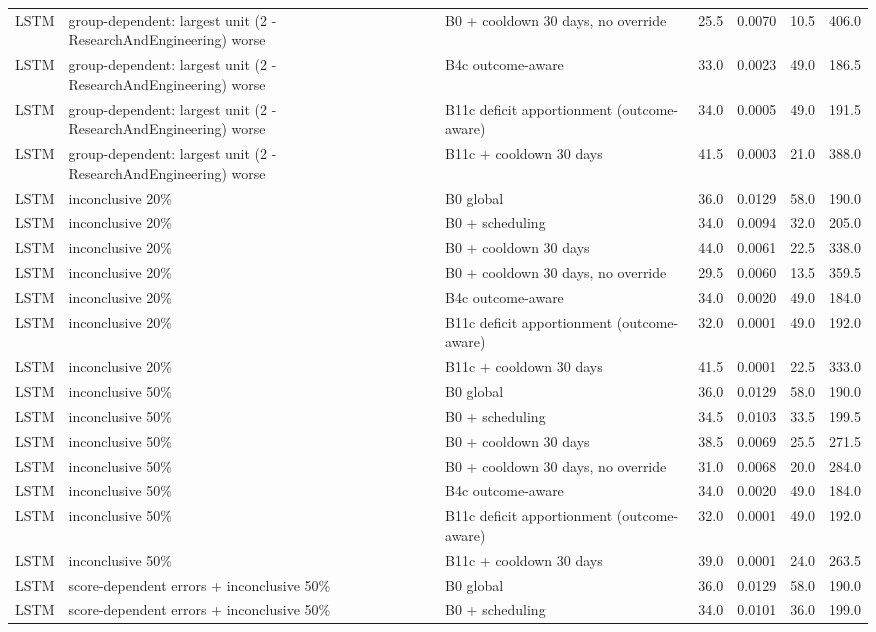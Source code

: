 \documentclass[10pt,onecolumn,letterpaper]{article}
\begin{document}
\begin{longtable}{lp{5.2cm}p{4.4cm}cccc}
LSTM & group-dependent: largest unit (2 - ResearchAndEngineering) worse & B0 + cooldown 30 days, no override & 25.5 & 0.0070 & 10.5 & 406.0 \\
LSTM & group-dependent: largest unit (2 - ResearchAndEngineering) worse & B4c outcome-aware & 33.0 & 0.0023 & 49.0 & 186.5 \\
LSTM & group-dependent: largest unit (2 - ResearchAndEngineering) worse & B11c deficit apportionment (outcome-aware) & 34.0 & 0.0005 & 49.0 & 191.5 \\
LSTM & group-dependent: largest unit (2 - ResearchAndEngineering) worse & B11c + cooldown 30 days & 41.5 & 0.0003 & 21.0 & 388.0 \\
LSTM & inconclusive 20\% & B0 global & 36.0 & 0.0129 & 58.0 & 190.0 \\
LSTM & inconclusive 20\% & B0 + scheduling & 34.0 & 0.0094 & 32.0 & 205.0 \\
LSTM & inconclusive 20\% & B0 + cooldown 30 days & 44.0 & 0.0061 & 22.5 & 338.0 \\
LSTM & inconclusive 20\% & B0 + cooldown 30 days, no override & 29.5 & 0.0060 & 13.5 & 359.5 \\
LSTM & inconclusive 20\% & B4c outcome-aware & 34.0 & 0.0020 & 49.0 & 184.0 \\
LSTM & inconclusive 20\% & B11c deficit apportionment (outcome-aware) & 32.0 & 0.0001 & 49.0 & 192.0 \\
LSTM & inconclusive 20\% & B11c + cooldown 30 days & 41.5 & 0.0001 & 22.5 & 333.0 \\
LSTM & inconclusive 50\% & B0 global & 36.0 & 0.0129 & 58.0 & 190.0 \\
LSTM & inconclusive 50\% & B0 + scheduling & 34.5 & 0.0103 & 33.5 & 199.5 \\
LSTM & inconclusive 50\% & B0 + cooldown 30 days & 38.5 & 0.0069 & 25.5 & 271.5 \\
LSTM & inconclusive 50\% & B0 + cooldown 30 days, no override & 31.0 & 0.0068 & 20.0 & 284.0 \\
LSTM & inconclusive 50\% & B4c outcome-aware & 34.0 & 0.0020 & 49.0 & 184.0 \\
LSTM & inconclusive 50\% & B11c deficit apportionment (outcome-aware) & 32.0 & 0.0001 & 49.0 & 192.0 \\
LSTM & inconclusive 50\% & B11c + cooldown 30 days & 39.0 & 0.0001 & 24.0 & 263.5 \\
LSTM & score-dependent errors + inconclusive 50\% & B0 global & 36.0 & 0.0129 & 58.0 & 190.0 \\
LSTM & score-dependent errors + inconclusive 50\% & B0 + scheduling & 34.0 & 0.0101 & 36.0 & 199.0 \\

\end{longtable}
\end{document}
